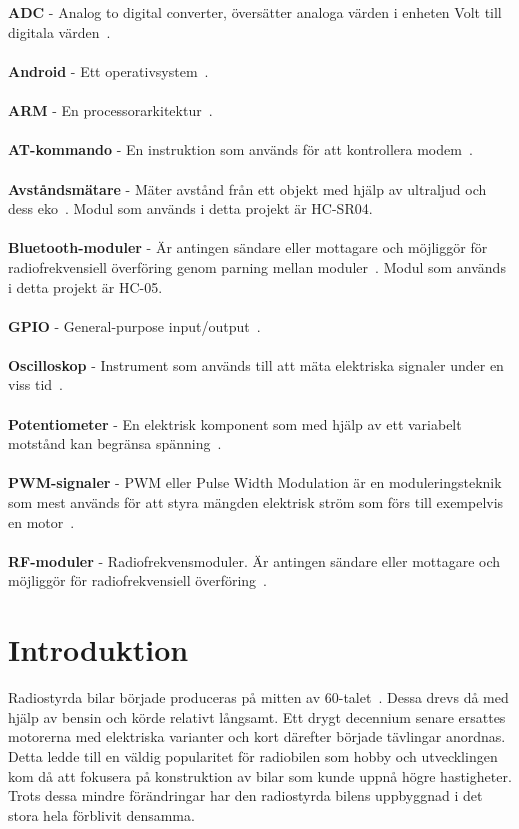 \documentclass[a4paper]{article}
\begin{document}
\newpage
{}
\\\\
{\bf ADC} - Analog to digital converter, översätter analoga värden i enheten Volt till digitala värden~\cite{ADC}.
\\\\
{\bf Android} - Ett operativsystem~\cite{Android}.
\\\\
{\bf ARM} - En processorarkitektur~\cite{chalmersARM}.
\\\\
{\bf AT-kommando} - En instruktion som används för att kontrollera modem~\cite{AT}.
\\\\
{\bf Avståndsmätare} - Mäter avstånd från ett objekt med hjälp av ultraljud och dess eko~\cite{DistMeasure}. Modul som används i detta projekt är HC-SR04.
\\\\
{\bf Bluetooth-moduler} - Är antingen sändare eller mottagare och möjliggör för radiofrekvensiell överföring genom parning mellan moduler~\cite{Bluetooth}. Modul som används i detta projekt är HC-05.
\\\\
{\bf GPIO} - General-purpose input/output~\cite{chalmersARM}.
\\\\
{\bf Oscilloskop} - Instrument som används till att mäta elektriska signaler under en viss tid~\cite{oscilloscope}.
\\\\
{\bf Potentiometer} - En elektrisk komponent som med hjälp av ett variabelt motstånd kan begränsa spänning~\cite{Potentiometer}.
\\\\
{\bf PWM-signaler} - PWM eller Pulse Width Modulation är en moduleringsteknik som mest används för att styra mängden elektrisk ström som förs till exempelvis en motor~\cite{PWM}.
\\\\
{\bf RF-moduler} - Radiofrekvensmoduler. Är antingen sändare eller mottagare och möjliggör för radiofrekvensiell överföring~\cite{RFModule}.





\newpage
\section{Introduktion}
Radiostyrda bilar började produceras på mitten av 60-talet~\cite{RCHistory}. Dessa drevs då med hjälp av bensin och körde relativt långsamt. Ett drygt decennium senare ersattes motorerna med elektriska varianter och kort därefter började tävlingar anordnas. Detta ledde till en väldig popularitet för radiobilen som hobby och utvecklingen kom då att fokusera på konstruktion av bilar som kunde uppnå högre hastigheter. Trots dessa mindre förändringar har den radiostyrda bilens uppbyggnad i det stora hela förblivit densamma.
\end{document}

